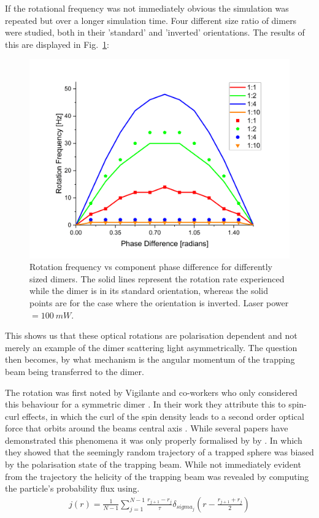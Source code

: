 If the rotational frequency was not immediately obvious the simulation was
repeated but over a longer simulation time. Four different size ratio of 
dimers were studied, both in their 'standard' and 'inverted' orientations. 
The results of this are displayed in Fig.~\ref{fig:rotation_vs_pol}:
\begin{figure}[h!]
	\centering
	\includegraphics[width=\linewidth]{rotation_vs_pol.png}
	\caption{Rotation frequency vs component phase difference for differently 
		sized dimers. The solid lines represent the rotation rate experienced 
		while the dimer is in its standard orientation, whereas the solid points are for the case where the orientation is inverted. Laser power $= 100\ mW$.}
	\label{fig:rotation_vs_pol}
\end{figure}

This shows us that these optical rotations are polarisation dependent 
and not merely an example of the dimer scattering light asymmetrically. 
The question then becomes, by what mechanism is the angular momentum of
the trapping beam being transferred to the dimer.

The rotation was first noted by Vigilante and co-workers who only 
considered this behaviour for a symmetric dimer \cite{Vigilante2020}.
In their work they attribute this to spin-curl effects, in which the 
curl of the spin density leads to a second order optical force that 
orbits around the beams central axis \cite{Yevick2017}. While several 
papers have demonstrated this phenomena \cite{Zhao2007,Zhao2009, Wang2010} 
it was only properly formalised by by \cite{Ruffner2012}. In which they 
showed that the seemingly random trajectory of a trapped sphere was biased
by the polarisation state of the trapping beam. While not immediately 
evident from the trajectory the helicity of the trapping beam was revealed 
by computing the particle's probability flux using.
\begin{align}
	j(r) = \frac{1}{N-1} \sum_{j=1}^{N-1}
	\frac{r_{j+1}-r_j}{\tau}\delta_{sigma_j}\left(r-\frac{r_{j+1}+r_j}{2}\right)
	\label{eq:prob_flux}
\end{align}

